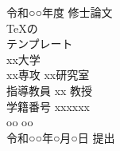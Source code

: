 

\begin{titlepage}
	\begin{center}
		\vspace*{30truept}
		{\Large 令和○○年度 修士論文} \\
		\vspace{100truept}
		{\LARGE TeXの}\\
		\vspace{12truept}
		{\LARGE テンプレート} \\
		\vspace{80truept}
		{\large
		xx大学\\
		xx専攻 xx研究室\\
		指導教員 xx 教授\\
		}
		\vspace{50truept}
		{\large 学籍番号 xxxxxx}\\ %
	
		\vspace{10truept}
		{\large  oo oo}\\ %
	
		\vspace{50truept}
		{\large 令和○○年○月○日 提出}\\ %
	\end{center}
\end{titlepage}



